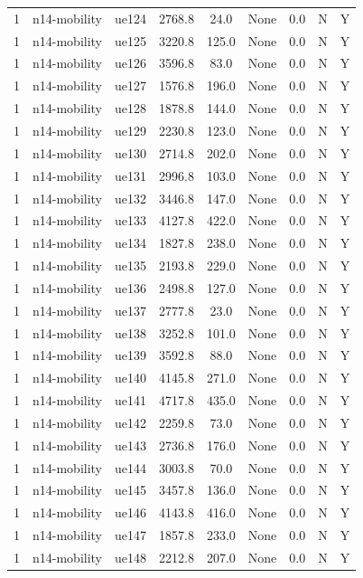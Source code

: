 \begin{table}[ht]
\begin{tabular}{|c|c|c|c|c|c|c|c|c|}
1 & n14-mobility & ue124 & 2768.8 & 24.0 & None & 0.0 & N & Y \\
1 & n14-mobility & ue125 & 3220.8 & 125.0 & None & 0.0 & N & Y \\
1 & n14-mobility & ue126 & 3596.8 & 83.0 & None & 0.0 & N & Y \\
1 & n14-mobility & ue127 & 1576.8 & 196.0 & None & 0.0 & N & Y \\
1 & n14-mobility & ue128 & 1878.8 & 144.0 & None & 0.0 & N & Y \\
1 & n14-mobility & ue129 & 2230.8 & 123.0 & None & 0.0 & N & Y \\
1 & n14-mobility & ue130 & 2714.8 & 202.0 & None & 0.0 & N & Y \\
1 & n14-mobility & ue131 & 2996.8 & 103.0 & None & 0.0 & N & Y \\
1 & n14-mobility & ue132 & 3446.8 & 147.0 & None & 0.0 & N & Y \\
1 & n14-mobility & ue133 & 4127.8 & 422.0 & None & 0.0 & N & Y \\
1 & n14-mobility & ue134 & 1827.8 & 238.0 & None & 0.0 & N & Y \\
1 & n14-mobility & ue135 & 2193.8 & 229.0 & None & 0.0 & N & Y \\
1 & n14-mobility & ue136 & 2498.8 & 127.0 & None & 0.0 & N & Y \\
1 & n14-mobility & ue137 & 2777.8 & 23.0 & None & 0.0 & N & Y \\
1 & n14-mobility & ue138 & 3252.8 & 101.0 & None & 0.0 & N & Y \\
1 & n14-mobility & ue139 & 3592.8 & 88.0 & None & 0.0 & N & Y \\
1 & n14-mobility & ue140 & 4145.8 & 271.0 & None & 0.0 & N & Y \\
1 & n14-mobility & ue141 & 4717.8 & 435.0 & None & 0.0 & N & Y \\
1 & n14-mobility & ue142 & 2259.8 & 73.0 & None & 0.0 & N & Y \\
1 & n14-mobility & ue143 & 2736.8 & 176.0 & None & 0.0 & N & Y \\
1 & n14-mobility & ue144 & 3003.8 & 70.0 & None & 0.0 & N & Y \\
1 & n14-mobility & ue145 & 3457.8 & 136.0 & None & 0.0 & N & Y \\
1 & n14-mobility & ue146 & 4143.8 & 416.0 & None & 0.0 & N & Y \\
1 & n14-mobility & ue147 & 1857.8 & 233.0 & None & 0.0 & N & Y \\
1 & n14-mobility & ue148 & 2212.8 & 207.0 & None & 0.0 & N & Y \\

\end{tabular}
\end{table}
